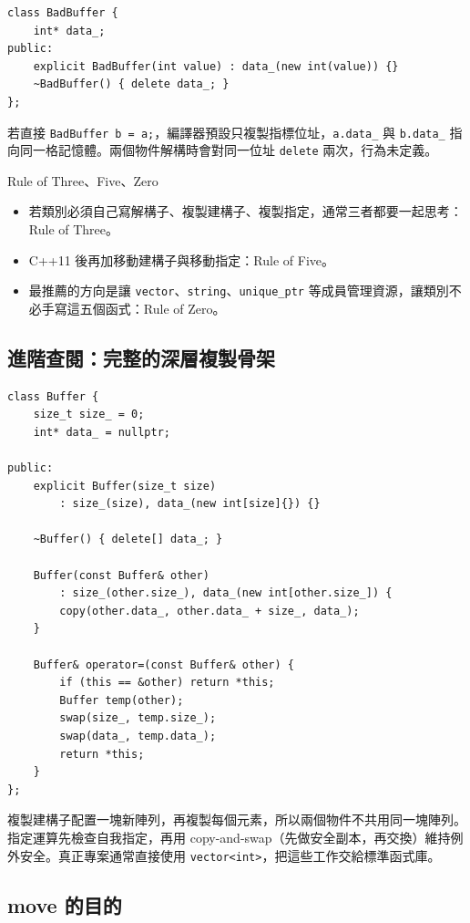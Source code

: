 \documentclass[11pt,a4paper]{article}
\newcommand{\code}[1]{\texttt{#1}}
\begin{document}
\begin{lstlisting}
class BadBuffer {
    int* data_;
public:
    explicit BadBuffer(int value) : data_(new int(value)) {}
    ~BadBuffer() { delete data_; }
};
\end{lstlisting}

若直接 \code{BadBuffer b = a;}，編譯器預設只複製指標位址，\code{a.data\_} 與 \code{b.data\_} 指向同一格記憶體。兩個物件解構時會對同一位址 \code{delete} 兩次，行為未定義。

\begin{keybox}{Rule of Three、Five、Zero}
\begin{itemize}
  \item 若類別必須自己寫解構子、複製建構子、複製指定，通常三者都要一起思考：Rule of Three。
  \item C++11 後再加移動建構子與移動指定：Rule of Five。
  \item 最推薦的方向是讓 \code{vector}、\code{string}、\code{unique\_ptr} 等成員管理資源，讓類別不必手寫這五個函式：Rule of Zero。
\end{itemize}
\end{keybox}

\subsection{進階查閱：完整的深層複製骨架}

\begin{lstlisting}
class Buffer {
    size_t size_ = 0;
    int* data_ = nullptr;

public:
    explicit Buffer(size_t size)
        : size_(size), data_(new int[size]{}) {}

    ~Buffer() { delete[] data_; }

    Buffer(const Buffer& other)
        : size_(other.size_), data_(new int[other.size_]) {
        copy(other.data_, other.data_ + size_, data_);
    }

    Buffer& operator=(const Buffer& other) {
        if (this == &other) return *this;
        Buffer temp(other);
        swap(size_, temp.size_);
        swap(data_, temp.data_);
        return *this;
    }
};
\end{lstlisting}

複製建構子配置一塊新陣列，再複製每個元素，所以兩個物件不共用同一塊陣列。指定運算先檢查自我指定，再用 copy-and-swap（先做安全副本，再交換）維持例外安全。真正專案通常直接使用 \code{vector<int>}，把這些工作交給標準函式庫。

\subsection{move 的目的}
\end{document}
